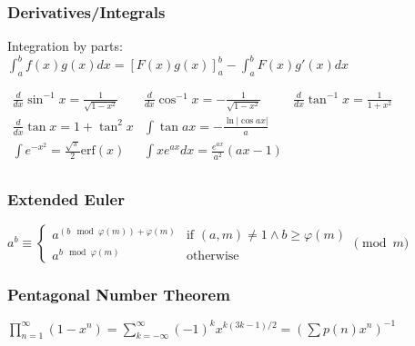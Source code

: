 \subsubsection{Derivatives/Integrals}
Integration by parts:
\(\int_a^bf(x)g(x)dx = [F(x)g(x)]_a^b-\int_a^bF(x)g'(x)dx\)
{

  \noindent
  \(
  \begin{aligned}
    \frac{d}{dx}\sin^{-1} x = \frac{1}{\sqrt{1-x^2}}
    &
    \frac{d}{dx}\cos^{-1} x = -\frac{1}{\sqrt{1-x^2}}
    &
    \frac{d}{dx}\tan^{-1} x = \frac{1}{1+x^2}
    \\
    \frac{d}{dx}\tan x = 1+\tan^2 x
    &
    \int\tan ax = -\frac{\ln|\cos ax|}{a}
    &
    \\
    \int e^{-x^2} = \frac{\sqrt \pi}{2} \text{erf}(x)
    &
    \int xe^{ax}dx = \frac{e^{ax}}{a^2}(ax-1)
    \\
  \end{aligned}
  \)
}

\subsubsection{Extended Euler}
\(
a^b \equiv \begin{cases}
 a^{(b \mod{\varphi(m)}) + \varphi(m)}& \text{if } (a, m) \neq 1 \land b \geq \varphi(m) \\
 a^{b \mod{\varphi(m)}} & \text{otherwise}
\end{cases}
\pmod{m}
\)

\subsubsection{Pentagonal Number Theorem}
\(
\prod _{n=1}^{\infty }\left(1-x^{n}\right)=\sum _{k=-\infty }^{\infty }\left(-1\right)^{k}x^{k\left(3k-1\right)/2}=
\left(\sum p(n) x^n\right)^{-1}
\)

